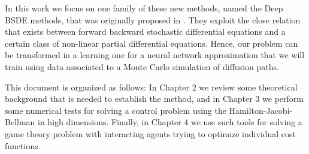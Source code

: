 In this work we focus on one family of these new methods, named the Deep BSDE methods, that was originally proposed in \cite{han_solving_2018}. They exploit the close relation that exists between forward backward stochastic differential equations and a certain class of non-linear partial differential equations. Hence, our problem can be transformed in a learning one for a neural network approximation that we will train using data associated to a Monte Carlo simulation of diffusion paths.

This document is organized as follows: In Chapter 2 we review some theoretical background that is needed to establish the method, and in Chapter 3 we perform some numerical tests for solving a control problem using the Hamilton-Jacobi-Bellman in high dimensions. Finally, in Chapter 4 we use such tools for solving a game theory problem with interacting agents trying to optimize individual cost functions. 